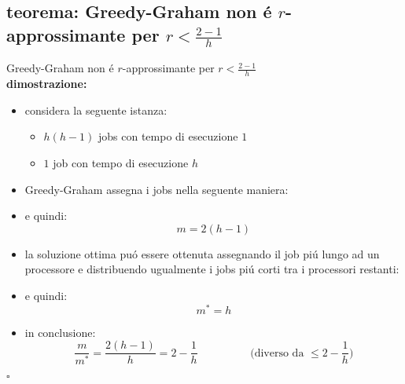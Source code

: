 \subsection*{teorema: Greedy-Graham non \'e $r$-approssimante per $r<\frac{2-1}{h}$}
\begin{flushleft}
	Greedy-Graham non \'e $r$-approssimante per $r<\frac{2-1}{h}$ \newline \\
	\vspace{0.5cm}
	\textbf{dimostrazione:}
	\begin{itemize}
		\item considera la seguente istanza:
		\begin{itemize}
			\item $h(h-1)$ jobs con tempo di esecuzione $1$
			\item $1$ job con tempo di esecuzione $h$
		\end{itemize}
		\item Greedy-Graham assegna i jobs nella seguente maniera:
		\item e quindi: $$m=2(h-1)$$
		\item la soluzione ottima pu\'o essere ottenuta assegnando il job pi\'u lungo ad un processore e distribuendo ugualmente i jobs pi\'u corti tra i processori restanti:
		\item e quindi: $$m^*=h$$
		\item in conclusione:
			$$\frac{m}{m^*}=\frac{2(h-1)}{h}=2-\frac{1}{h}\hspace{2cm}\text{(diverso da }\leq 2-\frac{1}{h}\text{)}$$
	\end{itemize}
	\hfill$\square$
\end{flushleft}


